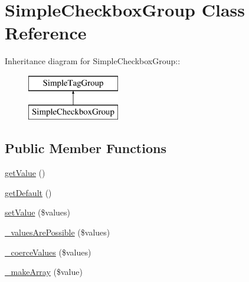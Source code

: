 \hypertarget{class_simple_checkbox_group}{
\section{SimpleCheckboxGroup Class Reference}
\label{class_simple_checkbox_group}
}
Inheritance diagram for SimpleCheckboxGroup::\begin{figure}[H]
\begin{center}
\leavevmode
\includegraphics[height=2cm]{class_simple_checkbox_group}
\end{center}
\end{figure}
\subsection*{Public Member Functions}
\begin{DoxyCompactItemize}
\item 
\hyperlink{class_simple_checkbox_group_a6b1347f1de590501b5ffe6c832c6ce3e}{getValue} ()
\item 
\hyperlink{class_simple_checkbox_group_afa20a2b8f875b255b3c87a71772221b6}{getDefault} ()
\item 
\hyperlink{class_simple_checkbox_group_a62af0724806496a31c75ffe0dc06d5b0}{setValue} (\$values)
\item 
\hyperlink{class_simple_checkbox_group_a7502967bd2c4adc191d9d1e8d1a7e8db}{\_\-valuesArePossible} (\$values)
\item 
\hyperlink{class_simple_checkbox_group_afe4a2ea02b092de7e39f158d793eda48}{\_\-coerceValues} (\$values)
\item 
\hyperlink{class_simple_checkbox_group_ae5034a9e6326cbb740d709b1b5c6defe}{\_\-makeArray} (\$value)
\end{DoxyCompactItemize}



